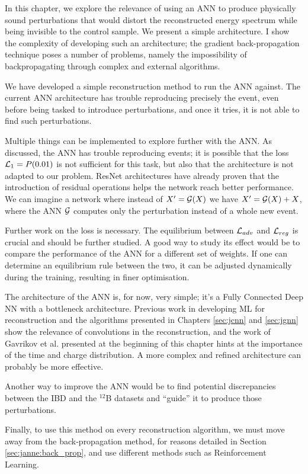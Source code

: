 \documentclass[../main.tex]{subfiles}
\begin{document}
In this chapter, we explore the relevance of using an ANN to produce physically sound perturbations that would distort the reconstructed energy spectrum while being invisible to the control sample. We present a simple architecture. I show the complexity of developing such an architecture; the gradient back-propagation technique poses a number of problems, namely the impossibility of backpropagating through complex and external algorithms.

We have developed a simple reconstruction method to run the ANN against. The current ANN architecture has trouble reproducing precisely the event, even before being tasked to introduce perturbations, and once it tries, it is not able to find such perturbations.

Multiple things can be implemented to explore further with the ANN. As discussed, the ANN has trouble reproducing events; it is possible that the loss ${\cal L}_1 = P(0.01)$ is not sufficient for this task, but also that the architecture is not adapted to our problem. ResNet architectures \cite{he_deep_2016} have already proven that the introduction of residual operations helps the network reach better performance. We can imagine a network where instead of $X' = {\cal G}(X)$ we have $X' = {\cal G}(X) + X$, where the ANN ${\cal G}$ computes only the perturbation instead of a whole new event.

Further work on the loss is necessary. The equilibrium between ${\cal L}_{adv}$ and ${\cal L}_{reg}$ is crucial and should be further studied. A good way to study its effect would be to compare the performance of the ANN for a different set of weights. If one can determine an equilibrium rule between the two, it can be adjusted dynamically during the training, resulting in finer optimisation.

The architecture of the ANN is, for now, very simple; it’s a Fully Connected Deep NN with a bottleneck architecture. Previous work in developing ML for reconstruction \cite{qian_vertex_2021} and the algorithms presented in Chapters \ref{sec:jcnn} and \ref{sec:jgnn} show the relevance of convolutions in the reconstruction, and the work of Gavrikov et al. \cite{gavrikov_energy_2022} presented at the beginning of this chapter hints at the importance of the time and charge distribution. A more complex and refined architecture can probably be more effective.

Another way to improve the ANN would be to find potential discrepancies between the IBD and the $^{12}$B datasets and ``guide'' it to produce those perturbations.

Finally, to use this method on every reconstruction algorithm, we must move away from the back-propagation method, for reasons detailed in Section \ref{sec:janne:back_prop}, and use different methods such as Reinforcement Learning.
\end{document}
